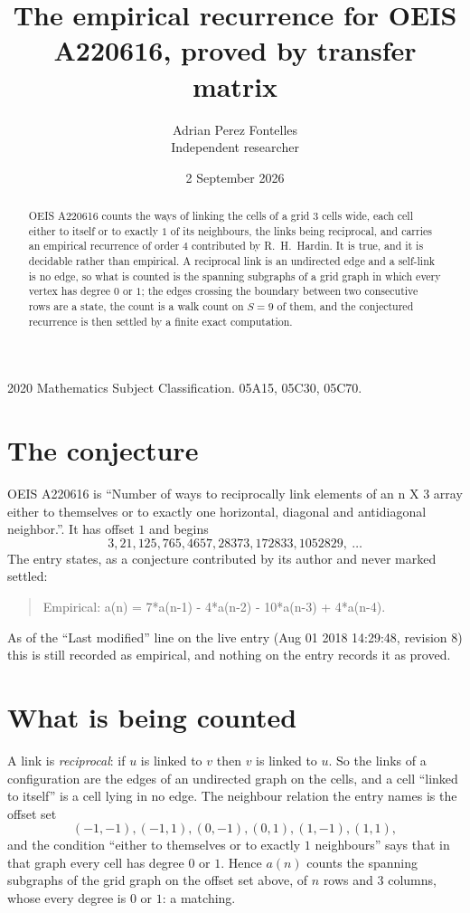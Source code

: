 \documentclass[11pt,a4paper]{article}
\title{The empirical recurrence for OEIS A220616, proved by transfer matrix}
\author{Adrian Perez Fontelles\\ \small Independent researcher}
\date{2 September 2026}
\theoremstyle{plain}
\theoremstyle{definition}
\begin{document}
\maketitle

\begin{abstract}
OEIS A220616 counts the ways of linking the cells of a grid $3$ cells wide, each cell either to
itself or to exactly $1$ of its neighbours, the links being reciprocal, and carries an
empirical recurrence of order $4$ contributed by R.~H.~Hardin. It is true, and it is
decidable rather than empirical. A reciprocal link is an undirected edge and a self-link is
no edge, so what is counted is the spanning subgraphs of a grid graph in which every vertex
has degree $0$ or $1$; the edges crossing the boundary between two consecutive rows are a
state, the count is a walk count on $S=9$ of them, and the conjectured recurrence is then
settled by a finite exact computation.
\end{abstract}

\noindent\small 2020 Mathematics Subject Classification. 05A15, 05C30, 05C70.\normalsize

\section{The conjecture}

OEIS A220616 is ``Number of ways to reciprocally link elements of an n X 3 array either to themselves or to exactly one horizontal, diagonal and antidiagonal neighbor.''. It has offset $1$ and begins
\[
3, 21, 125, 765, 4657, 28373, 172833, 1052829,\ \dots
\]
The entry states, as a conjecture contributed by its author and never marked settled:
\begin{quote}
Empirical: a(n) = 7*a(n-1) - 4*a(n-2) - 10*a(n-3) + 4*a(n-4).
\end{quote}
As of the ``Last modified'' line on the live entry (Aug 01 2018 14:29:48, revision 8) this is still
recorded as empirical, and nothing on the entry records it as proved.

\section{What is being counted}

A link is \emph{reciprocal}: if $u$ is linked to $v$ then $v$ is linked to $u$. So the links
of a configuration are the edges of an undirected graph on the cells, and a cell ``linked to
itself'' is a cell lying in no edge. The neighbour relation the entry names is the offset set
\[
(-1,-1), (-1,1), (0,-1), (0,1), (1,-1), (1,1),
\]
and the condition ``either to themselves or to exactly $1$ neighbours'' says that in that
graph every cell has degree $0$ or $1$. Hence $a(n)$ counts the spanning subgraphs of the
grid graph on the offset set above, of $n$ rows and $3$ columns,
whose every degree is $0$ or $1$: a matching.
\end{document}
